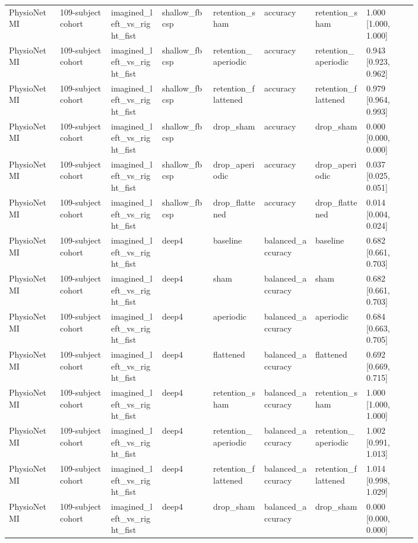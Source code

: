 \begin{longtable}{p{0.10\linewidth}p{0.10\linewidth}p{0.10\linewidth}p{0.10\linewidth}p{0.10\linewidth}p{0.10\linewidth}p{0.10\linewidth}p{0.10\linewidth}}
PhysioNet MI & 109-subject cohort & imagined\_left\_vs\_right\_fist & shallow\_fbcsp & retention\_sham & accuracy & retention\_sham & 1.000 [1.000, 1.000]\\
PhysioNet MI & 109-subject cohort & imagined\_left\_vs\_right\_fist & shallow\_fbcsp & retention\_aperiodic & accuracy & retention\_aperiodic & 0.943 [0.923, 0.962]\\
PhysioNet MI & 109-subject cohort & imagined\_left\_vs\_right\_fist & shallow\_fbcsp & retention\_flattened & accuracy & retention\_flattened & 0.979 [0.964, 0.993]\\
PhysioNet MI & 109-subject cohort & imagined\_left\_vs\_right\_fist & shallow\_fbcsp & drop\_sham & accuracy & drop\_sham & 0.000 [0.000, 0.000]\\
PhysioNet MI & 109-subject cohort & imagined\_left\_vs\_right\_fist & shallow\_fbcsp & drop\_aperiodic & accuracy & drop\_aperiodic & 0.037 [0.025, 0.051]\\
PhysioNet MI & 109-subject cohort & imagined\_left\_vs\_right\_fist & shallow\_fbcsp & drop\_flattened & accuracy & drop\_flattened & 0.014 [0.004, 0.024]\\
PhysioNet MI & 109-subject cohort & imagined\_left\_vs\_right\_fist & deep4 & baseline & balanced\_accuracy & baseline & 0.682 [0.661, 0.703]\\
PhysioNet MI & 109-subject cohort & imagined\_left\_vs\_right\_fist & deep4 & sham & balanced\_accuracy & sham & 0.682 [0.661, 0.703]\\
PhysioNet MI & 109-subject cohort & imagined\_left\_vs\_right\_fist & deep4 & aperiodic & balanced\_accuracy & aperiodic & 0.684 [0.663, 0.705]\\
PhysioNet MI & 109-subject cohort & imagined\_left\_vs\_right\_fist & deep4 & flattened & balanced\_accuracy & flattened & 0.692 [0.669, 0.715]\\
PhysioNet MI & 109-subject cohort & imagined\_left\_vs\_right\_fist & deep4 & retention\_sham & balanced\_accuracy & retention\_sham & 1.000 [1.000, 1.000]\\
PhysioNet MI & 109-subject cohort & imagined\_left\_vs\_right\_fist & deep4 & retention\_aperiodic & balanced\_accuracy & retention\_aperiodic & 1.002 [0.991, 1.013]\\
PhysioNet MI & 109-subject cohort & imagined\_left\_vs\_right\_fist & deep4 & retention\_flattened & balanced\_accuracy & retention\_flattened & 1.014 [0.998, 1.029]\\
PhysioNet MI & 109-subject cohort & imagined\_left\_vs\_right\_fist & deep4 & drop\_sham & balanced\_accuracy & drop\_sham & 0.000 [0.000, 0.000]\\

\end{longtable}
